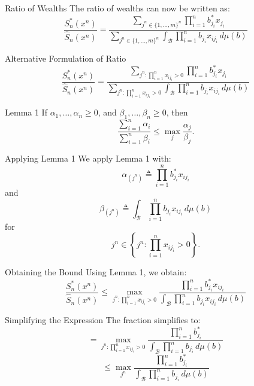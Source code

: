 \documentclass{beamer}
\begin{document}
\begin{small}
\begin{frame}{Ratio of Wealths}
    The ratio of wealths can now be written as:
    \[
        \frac{S_n^*(x^n)}{\hat{S}_n(x^n)}
        = \frac{\sum\limits_{j^n \in \{1, \dots, m\}^n} \prod\limits_{i=1}^{n} b^*_{j_i} x_{j_i}}
        {\sum\limits_{j^n \in \{1, \dots, m\}^n} \int_{\mathcal{B}} \prod\limits_{i=1}^{n} b_{j_i} x_{ij_i} \, d\mu(b)}
    \]
\end{frame}

\begin{frame}{Alternative Formulation of Ratio}
    \[
        \frac{S_n^*(x^n)}{\hat{S}_n(x^n)}
        = \frac{\sum\limits_{j^n: \prod\limits_{i=1}^{n} x_{ij_i} > 0} \prod\limits_{i=1}^{n} b^*_{j_i} x_{j_i}}
        {\sum\limits_{j^n: \prod\limits_{i=1}^{n} x_{ij_i} > 0} \int_{\mathcal{B}} \prod\limits_{i=1}^{n} b_{j_i} x_{ij_i} \, d\mu(b)}
    \]
\end{frame}

\begin{frame}{Lemma 1}
    If $\alpha_1, \dots, \alpha_n \geq 0$, and $\beta_1, \dots, \beta_n \geq 0$, then
    \[
        \frac{\sum\limits_{i=1}^{n} \alpha_i}{\sum\limits_{i=1}^{n} \beta_i} 
        \leq \max\limits_{j} \frac{\alpha_j}{\beta_j}.
    \]
\end{frame}


\begin{frame}{Applying Lemma 1}
    We apply Lemma 1 with:
    \[
        \alpha_{(j^n)} \triangleq \prod_{i=1}^{n} b^*_{j_i} x_{ij_i}
    \]
    and
    \[
        \beta_{(j^n)} \triangleq \int_{\mathcal{B}} \prod_{i=1}^{n} b_{j_i} x_{ij_i} \, d\mu(b)
    \]
    for
    \[
        j^n \in \left\{ j^n: \prod_{i=1}^{n} x_{ij_i} > 0 \right\}.
    \]
\end{frame}

\begin{frame}{Obtaining the Bound}
    Using Lemma 1, we obtain:
    \[
        \frac{S_n^*(x^n)}{\hat{S}_n(x^n)}
        \leq \max\limits_{j^n: \prod\limits_{i=1}^{n} x_{ij_i} > 0}
        \frac{\prod\limits_{i=1}^{n} b^*_{j_i} x_{ij_i}}
        {\int_{\mathcal{B}} \prod\limits_{i=1}^{n} b_{j_i} x_{ij_i} \, d\mu(b)}
    \]
\end{frame}

\begin{frame}{Simplifying the Expression}
    The fraction simplifies to:
    \[
        = \max\limits_{j^n: \prod\limits_{i=1}^{n} x_{ij_i} > 0}
        \frac{\prod\limits_{i=1}^{n} b^*_{j_i}}
        {\int_{\mathcal{B}} \prod\limits_{i=1}^{n} b_{j_i} \, d\mu(b)}
    \]
    \[
        \leq \max\limits_{j^n} \frac{\prod\limits_{i=1}^{n} b^*_{j_i}}
        {\int_{\mathcal{B}} \prod\limits_{i=1}^{n} b_{j_i} \, d\mu(b)}
    \]
\end{frame}


\end{small}
\end{document}
